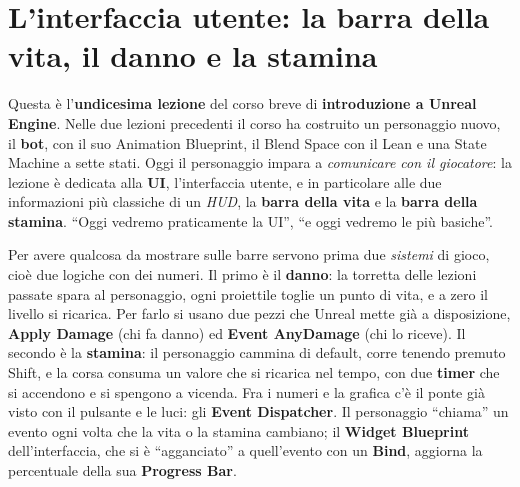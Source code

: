 %
%    
%

\chapter[UI: vita, danno e stamina]{L'interfaccia utente: la barra della vita, il danno
e la stamina}
\label{ue11:cap:ui}

Questa è l'\textbf{undicesima lezione} del corso breve di \textbf{introduzione a Unreal
Engine}. Nelle due lezioni precedenti il corso ha costruito un personaggio nuovo, il
\textbf{bot}, con il suo Animation Blueprint, il Blend Space con il Lean e una State
Machine a sette stati. Oggi il personaggio impara a \emph{comunicare con il giocatore}:
la lezione è dedicata alla \textbf{UI}, l'interfaccia utente, e in particolare alle due
informazioni più classiche di un \emph{HUD}, la \textbf{barra della vita} e la
\textbf{barra della stamina}. ``Oggi vedremo praticamente la UI'', ``e oggi vedremo le
più basiche''.

Per avere qualcosa da mostrare sulle barre servono prima due \emph{sistemi} di gioco,
cioè due logiche con dei numeri. Il primo è il \textbf{danno}: la torretta delle lezioni
passate spara al personaggio, ogni proiettile toglie un punto di vita, e a zero il livello
si ricarica. Per farlo si usano due pezzi che Unreal mette già a disposizione,
\textbf{Apply Damage} (chi fa danno) ed \textbf{Event AnyDamage} (chi lo riceve). Il
secondo è la \textbf{stamina}: il personaggio cammina di default, corre tenendo premuto
Shift, e la corsa consuma un valore che si ricarica nel tempo, con due \textbf{timer}
che si accendono e si spengono a vicenda. Fra i numeri e la grafica c'è il ponte già
visto con il pulsante e le luci: gli \textbf{Event Dispatcher}. Il personaggio
``chiama'' un evento ogni volta che la vita o la stamina cambiano; il \textbf{Widget
Blueprint} dell'interfaccia, che si è ``agganciato'' a quell'evento con un
\textbf{Bind}, aggiorna la percentuale della sua \textbf{Progress Bar}.

